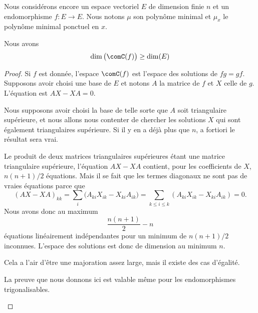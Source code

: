 Nous considérons encore un espace vectoriel \( E\) de dimension finie \( n\) et un endomorphisme \( f\colon E\to E\). Nous notons \( \mu\) son polynôme minimal et \( \mu_x\) le polynôme minimal ponctuel en \( x\).

\begin{lemma}       \label{LEMooDFFDooJTQkRu}
	Nous avons
	\begin{equation}
		\dim\big( \comC(f) \big)\geq \dim(E)
	\end{equation}
\end{lemma}

\begin{proof}
	Si \( f\) est donnée, l'espace \( \comC(f)\) est l'espace des solutions de \( fg=gf\). Supposons avoir choisi une base de \( E\) et notons \( A\) la matrice de \( f\) et \( X\) celle de \( g\). L'équation est \( AX-XA=0\).
	\begin{subproof}
		Nous supposons avoir choisi la base de telle sorte que \( A\) soit triangulaire supérieure, et nous allons nous contenter de chercher les solutions \( X\) qui sont également triangulaires supérieure. Si il y en a déjà plus que \( n\), a fortiori le résultat sera vrai.

		Le produit de deux matrices triangulaires supérieures étant une matrice triangulaire supérieure, l'équation \( AX-XA\) contient, pour les coefficients de \( X\), \( n(n+1)/2\) équations. Mais il se fait que les termes diagonaux ne sont pas de vraies équations parce que
		\begin{equation}
			(AX-XA)_{kk}=\sum_i\big( A_{ki}X_{ik}-X_{ki}A_{ik} \big)=\sum_{k\leq i\leq k}(A_{ki}X_{ik}-X_{ki}A_{ik})=0.
		\end{equation}
		Nous avons donc au maximum
		\begin{equation}
			\frac{ n(n+1) }{2}-n
		\end{equation}
		équations linéairement indépendantes pour un minimum de \( n(n+1)/2\) inconnues. L'espace des solutions est donc de dimension au minimum \( n\).

		Cela a l'air d'être une majoration assez large, mais il existe des cas d'égalité.


		La preuve que nous donnons ici est valable même pour les endomorphismes trigonalisables.


\end{subproof}
\end{proof}
